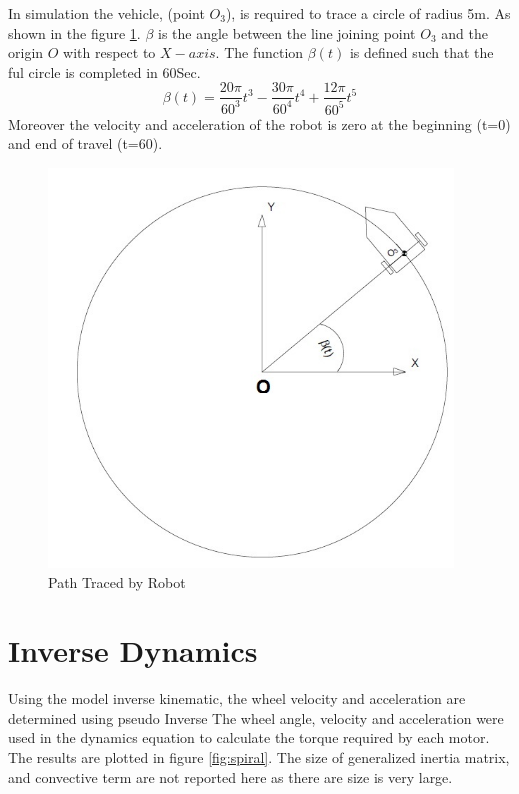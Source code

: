In  simulation the vehicle, (point $O_3$), is required to trace a circle of radius 5m. As shown in the figure \ref{fig:CirTrace}. $ \beta$ is the angle between the line joining  point $O_3$ and the origin $O$ with respect to $X-axis$. The function $\beta(t)$ is defined such that the ful circle is completed in 60Sec. 
\begin{equation}
\label{path}
\beta(t)=\frac{20\pi}{60^3}t^3-\frac{30\pi}{60^4}t^4+\frac{12\pi}{60^5}t^5
\end{equation}
Moreover the velocity and acceleration of the robot is zero at the beginning (t=0) and end of travel (t=60).

\begin{figure}[H]
	\centering
		\includegraphics[height=300pt,keepaspectratio]{Chapter4/fig/pathCircle}
		\caption{Path Traced by Robot}
	\label{fig:CirTrace}
\end{figure}



\section{Inverse Dynamics}
Using the model inverse kinematic,  the wheel velocity and acceleration are determined using pseudo Inverse  %
The wheel angle, velocity and acceleration were used in the dynamics equation  to calculate the torque required by each motor. The results are plotted in figure \ref{fig:spiral}.  The size of generalized inertia matrix,    and convective term   are not reported here as there are size is very large.


